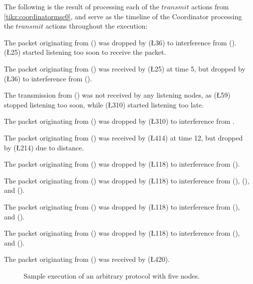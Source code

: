 The following is the result of processing each of the $transmit$ actions from \autoref{tikz:coordinatormsc0}, and serve as the timeline of the Coordinator processing the $transmit$ actions throughout the execution: %
%
\begin{description}[leftmargin=2em,style=nextline]
    \item[\T{4}{3}] The packet originating from  () was dropped by  (\L{3}{6}) to interference from  ().  (\L{2}{5}) started listening too soon to receive the packet.
    \item[\T{1}{5}] The packet originating from  () was received by  (\L{2}{5}) at time 5, but dropped by  (\L{3}{6}) to interference from  (). 
    \item[\T{1}{10}] The transmission from  () was not received by any listening nodes, as  (\L{5}{9}) stopped listening too soon, while  (\L{3}{10}) started listening too late.
    \item[\T{2}{10}] The packet originating from  () was dropped by  (\L{3}{10}) to interference from .
    \item[\T{5}{12}] The packet originating from  () was received by  (\L{4}{14}) at time 12, but dropped by  (\L{2}{14}) due to distance.
    \item[\T{3}{16}] The packet originating from  () was dropped by  (\L{1}{18}) to interference from  (). 
    \item[\T{4}{17}] The packet originating from  () was dropped by  (\L{1}{18}) to interference from  (),  (), and  ().
    \item[\T{2}{18}] The packet originating from  () was dropped by  (\L{1}{18}) to interference from  (), and  ().
    \item[\T{5}{18}] The packet originating from  () was dropped by  (\L{1}{18}) to interference from  (), and  ().
    \item[\T{3}{20}] The packet originating from  () was received by  (\L{4}{20}).
\end{description}

\begin{figure}[H]
    \centering
    \CoordinatorFigure{}
    \caption{Sample execution of an arbitrary protocol with five nodes.}\label{tikz:coordinatormsc0}
\end{figure}

